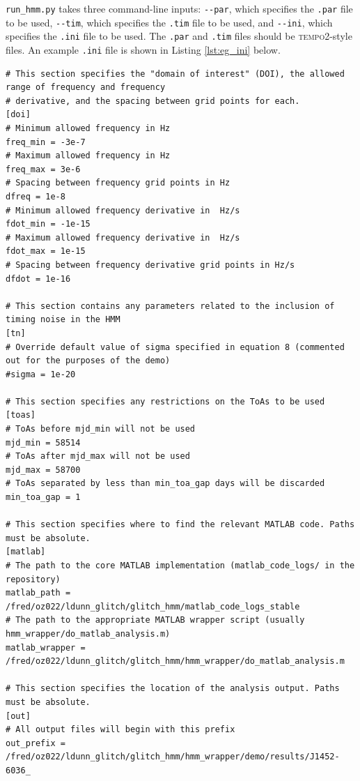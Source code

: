 \documentclass{article}
\newcommand{\tempo}{\textsc{tempo}2}
\begin{document}
\texttt{run\_hmm.py} takes three command-line inputs: \texttt{-\/-par}, which specifies the \texttt{.par} file to be used, \texttt{-\/-tim}, which specifies the \texttt{.tim} file to be used, and \texttt{-\/-ini}, which specifies the \texttt{.ini} file to be used.
The \texttt{.par} and \texttt{.tim} files should be \tempo{}-style files.
An example \texttt{.ini} file is shown in Listing \ref{lst:eg_ini} below.
\begin{lstlisting}[caption=Example \texttt{.ini} file, label={lst:eg_ini}]
# This section specifies the "domain of interest" (DOI), the allowed range of frequency and frequency
# derivative, and the spacing between grid points for each.
[doi]
# Minimum allowed frequency in Hz
freq_min = -3e-7  
# Maximum allowed frequency in Hz
freq_max = 3e-6 
# Spacing between frequency grid points in Hz
dfreq = 1e-8  
# Minimum allowed frequency derivative in  Hz/s
fdot_min = -1e-15 
# Maximum allowed frequency derivative in  Hz/s
fdot_max = 1e-15 
# Spacing between frequency derivative grid points in Hz/s
dfdot = 1e-16

# This section contains any parameters related to the inclusion of timing noise in the HMM
[tn]          
# Override default value of sigma specified in equation 8 (commented out for the purposes of the demo)
#sigma = 1e-20 

# This section specifies any restrictions on the ToAs to be used
[toas]
# ToAs before mjd_min will not be used
mjd_min = 58514 
# ToAs after mjd_max will not be used
mjd_max = 58700
# ToAs separated by less than min_toa_gap days will be discarded
min_toa_gap = 1                                                                        

# This section specifies where to find the relevant MATLAB code. Paths must be absolute.
[matlab]                                                       
# The path to the core MATLAB implementation (matlab_code_logs/ in the repository)
matlab_path = /fred/oz022/ldunn_glitch/glitch_hmm/matlab_code_logs_stable
# The path to the appropriate MATLAB wrapper script (usually hmm_wrapper/do_matlab_analysis.m)
matlab_wrapper = /fred/oz022/ldunn_glitch/glitch_hmm/hmm_wrapper/do_matlab_analysis.m 

# This section specifies the location of the analysis output. Paths must be absolute.
[out]
# All output files will begin with this prefix
out_prefix = /fred/oz022/ldunn_glitch/glitch_hmm/hmm_wrapper/demo/results/J1452-6036_
\end{lstlisting}
\end{document}

